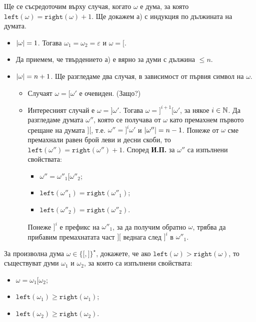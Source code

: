 \begin{hint}
  Ще се съсредоточим върху случая, когато $\omega$ е дума, за която $\texttt{left}(\omega) = \texttt{right}(\omega) + 1$.
  Ще докажем а) с индукция по дължината на думата.
  \begin{itemize}
  \item 
    $\lvert{\omega}\rvert = 1$. Тогава $\omega_1 = \omega_2 = \varepsilon$ и $\omega = \texttt{[}$.
  \item
    Да приемем, че твърдението а) е вярно за думи с дължина $\leq n$.
  \item
    $\lvert{\omega}\rvert = n+1$. Ще разгледаме два случая, в зависимост от първия символ на $\omega$.
    \begin{itemize}
    \item 
      Случаят $\omega = \texttt{[}\omega'$ е очевиден. (Защо?)
    \item
      Интересният случай е $\omega = \texttt{]}\omega'$.    
      Тогава $\omega = \texttt{]}^{i+1}\texttt{[}\omega'$, за някое $i \in \mathbb{N}$.
      Да разгледаме думата $\omega''$, която се получава от $\omega$
      като премахнем първото срещане на думата $\texttt{][}$, т.е. 
      $\omega'' = \texttt{]}^i\omega'$ и $\lvert{\omega''}\rvert = n-1$.
      Понеже от $\omega$ сме премахнали равен брой леви и десни скоби, то
      $\texttt{left}(\omega'') = \texttt{right}(\omega'')+1$.
      Според {\bf И.П.} за $\omega''$ са изпълнени свойствата:
      \begin{itemize}
      \item 
        $\omega'' = \omega''_1\texttt{[}\omega''_2$;
      \item
        $\texttt{left}(\omega''_1) = \texttt{right}(\omega''_1)$;
      \item
        $\texttt{left}(\omega''_2) = \texttt{right}(\omega''_2)$.
      \end{itemize}
      Понеже $\texttt{]}^i$ е префикс на $\omega''_1$, за да получим обратно $\omega$, трябва 
      да прибавим премахнатата част $\texttt{][}$ веднага след $\texttt{]}^i$ в $\omega''_1$.
    \end{itemize}
  \end{itemize}
\end{hint}

\begin{problem}
  За произволна дума $\omega \in \{ \texttt{[}, \texttt{]} \}^\star$, 
  докажете, че ако $\texttt{left}(\omega) > \texttt{right}(\omega)$, то съществуват думи $\omega_1$ и $\omega_2$,
  за които са изпълнени свойствата:
  \begin{itemize}
  \item 
    $\omega = \omega_1 \texttt{[} \omega_2$;
  \item
    $\texttt{left}(\omega_1) \geq \texttt{right}(\omega_1)$;
  \item
    $\texttt{left}(\omega_2) \geq \texttt{right}(\omega_2)$.
  \end{itemize}
\end{problem}

